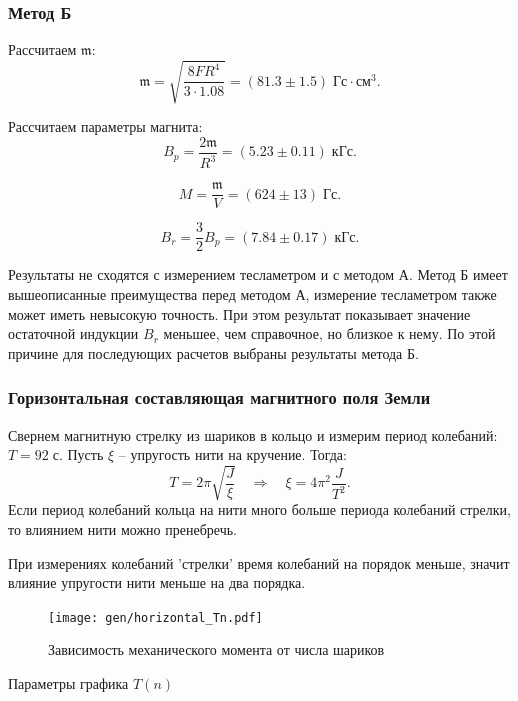 \documentclass[12pt,a4paper]{article}
\begin{document}
	\subsubsection*{Метод Б}
	
	Рассчитаем $\mathfrak{m}$:
	$$ \mathfrak{m} = \sqrt{\frac{8 F {R}^4}{3 \cdot 1.08}} = (81.3 \pm 1.5) \; \text{Гс} \cdot \text{см}^3. $$
	
	Рассчитаем параметры магнита:
	$$ B_p = \frac{2\mathfrak{m}}{R^3} = (5.23 \pm 0.11) \; \text{кГс}. $$
	
	$$ M = \frac{\mathfrak{m}}{V} = (624 \pm 13) \; \text{Гс}. $$
	
	$$ B_r = \frac{3}{2} B_p = (7.84 \pm 0.17) \; \text{кГс}. $$
	
	Результаты не сходятся с измерением тесламетром и с методом А. Метод Б имеет вышеописанные преимущества перед методом А, измерение тесламетром также может иметь невысокую точность. При этом результат показывает значение остаточной индукции $B_r$ меньшее, чем справочное, но близкое к нему. По этой причине для последующих расчетов выбраны результаты метода Б.
	
	\subsubsection*{Горизонтальная составляющая магнитного поля Земли}
	
	Свернем магнитную стрелку из шариков в кольцо и измерим период колебаний: $ T = 92 \; \text{с}$. Пусть $\xi$ -- упругость нити на кручение. Тогда:
	$$ T = 2 \pi \sqrt{\frac{J}{\xi}} \quad \Rightarrow \quad \xi = 4 \pi^2 \frac{J}{T^2}.$$
	Если период колебаний кольца на нити много больше периода колебаний стрелки, то влиянием нити можно пренебречь.
	

	При измерениях колебаний 'стрелки' время колебаний на порядок меньше, значит влияние упругости нити меньше на два порядка.
	
	\begin{figure}[H]
		\texttt{[image: gen/horizontal\_Tn.pdf]}
		\caption{Зависимость механического момента от числа шариков}
	\end{figure}
	
	\begin{table}[H]
		\caption{Параметры графика $T(n)$}
		
	\end{table}
	
\end{document}
